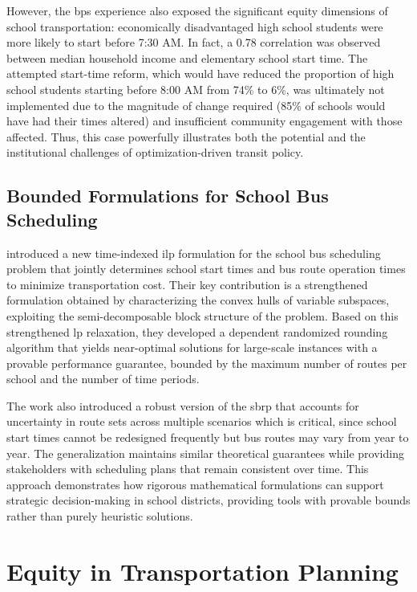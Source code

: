 However, the \gls{bps} experience also exposed the significant equity dimensions of school transportation: economically disadvantaged high school students were more likely to start before 7:30 AM. In fact, a 0.78 correlation was observed between median household income and elementary school start time. The attempted start-time reform, which would have reduced the proportion of high school students starting before 8:00 AM from 74\% to 6\%, was ultimately not implemented due to the magnitude of change required (85\% of schools would have had their times altered) and insufficient community engagement with those affected. Thus, this case powerfully illustrates both the potential and the institutional challenges of optimization-driven transit policy.

\subsection{Bounded Formulations for School Bus Scheduling}

\textcite{zeng2022Bounded} introduced a new time-indexed \gls{ilp} formulation for the school bus scheduling problem that jointly determines school start times and bus route operation times to minimize transportation cost. Their key contribution is a strengthened formulation obtained by characterizing the convex hulls of variable subspaces, exploiting the semi-decomposable block structure of the problem. Based on this strengthened \gls{lp} relaxation, they developed a dependent randomized rounding algorithm that yields near-optimal solutions for large-scale instances with a provable performance guarantee, bounded by the maximum number of routes per school and the number of time periods.

The work also introduced a robust version of the \gls{sbrp} that accounts for uncertainty in route sets across multiple scenarios which is critical, since school start times cannot be redesigned frequently but bus routes may vary from year to year. The generalization maintains similar theoretical guarantees while providing stakeholders with scheduling plans that remain consistent over time. This approach demonstrates how rigorous mathematical formulations can support strategic decision-making in school districts, providing tools with provable bounds rather than purely heuristic solutions.

\section{Equity in Transportation Planning}
